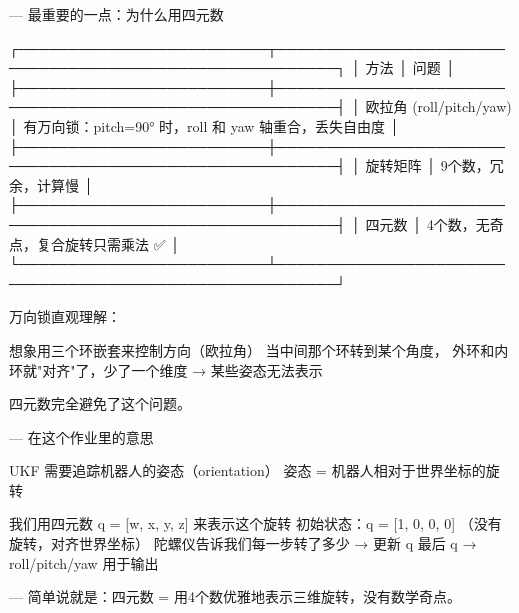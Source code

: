   ---
  最重要的一点：为什么用四元数

  ┌─────────────────────────┬────────────────────────────────────────────────────────┐
  │          方法           │                          问题                          │
  ├─────────────────────────┼────────────────────────────────────────────────────────┤
  │ 欧拉角 (roll/pitch/yaw) │ 有万向锁：pitch=90° 时，roll 和 yaw 轴重合，丢失自由度 │
  ├─────────────────────────┼────────────────────────────────────────────────────────┤
  │ 旋转矩阵                │ 9个数，冗余，计算慢                                    │
  ├─────────────────────────┼────────────────────────────────────────────────────────┤
  │ 四元数                  │ 4个数，无奇点，复合旋转只需乘法 ✅                     │
  └─────────────────────────┴────────────────────────────────────────────────────────┘

  万向锁直观理解：

  想象用三个环嵌套来控制方向（欧拉角）
  当中间那个环转到某个角度，
  外环和内环就"对齐"了，少了一个维度
  → 某些姿态无法表示

  四元数完全避免了这个问题。

  ---
  在这个作业里的意思

  UKF 需要追踪机器人的姿态（orientation）
  姿态 = 机器人相对于世界坐标的旋转

  我们用四元数 q = [w, x, y, z] 来表示这个旋转
  初始状态：q = [1, 0, 0, 0] （没有旋转，对齐世界坐标）
  陀螺仪告诉我们每一步转了多少 → 更新 q
  最后 q → roll/pitch/yaw 用于输出

  ---
  简单说就是：四元数 = 用4个数优雅地表示三维旋转，没有数学奇点。



  